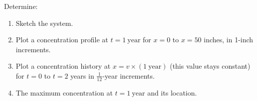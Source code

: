 \documentclass[12pt]{article}
\begin{document}
\begin{enumerate}
Determine:
\begin{enumerate}
\item Sketch the system.
\item Plot a concentration profile at $t = 1~\text{year}$ for $x = 0$ to $x = 50$ inches, in 1-inch increments.
\item Plot a concentration history at $x=v\times (1~\text{year})$ (this value stays constant) for $t = 0$ to $t = 2 $ years in $\frac{1}{12}$-year increments.
\item The maximum concentration at $t = 1~\text{year}$ and its location.
\end{enumerate}


\end{enumerate}
\end{document}
